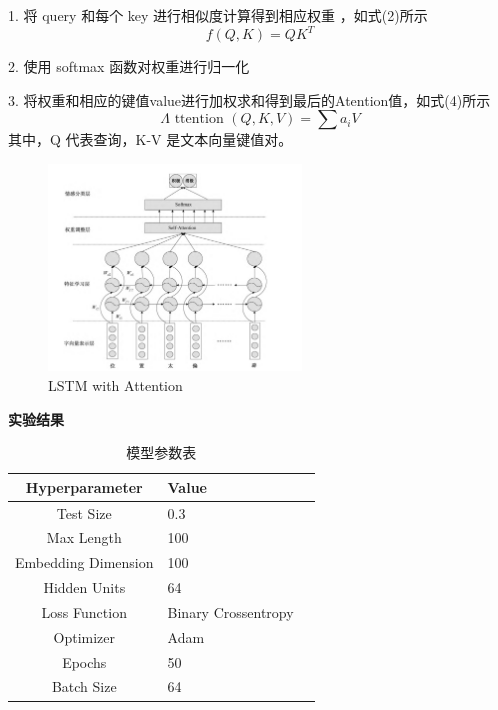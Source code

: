 \documentclass[hyperref,a4paper,UTF8]{ctexart}
\begin{document}
1. 将 query 和每个 key 进行相似度计算得到相应权重 ，如式(2)所示 
    \begin{equation}
    f(Q, K)=Q K^T
    \end{equation}

    
2. 使用 softmax 函数对权重进行归一化


3. 将权重和相应的键值value进行加权求和得到最后的Atention值，如式(4)所示
    \begin{equation}
    \Lambda \text { ttention }(Q, K, V)=\sum a_i V
    \end{equation}
 其中，Q 代表查询，K-V 是文本向量键值对。


\begin{figure}[ht]
	\centering
	\includegraphics[width=0.6\textwidth]{fig/pic4.png}
	\caption{LSTM with Attention}
    \label{fig:example}
\end{figure}

\textbf{实验结果}


\begin{table}[ht]
    \centering
    \begin{tabular}{c|lr}
        \toprule
        \textbf{Hyperparameter} & \textbf{Value} \\
        \midrule
        Test Size & 0.3 \\
        Max Length & 100 \\
        Embedding Dimension & 100 \\
        Hidden Units & 64 \\
        Loss Function & Binary Crossentropy \\
        Optimizer & Adam \\
        Epochs & 50 \\
        Batch Size & 64 \\
        \bottomrule
    \end{tabular}
    \caption{模型参数表}
    \label{tab:hyperparameters}
\end{table}
\end{document}

